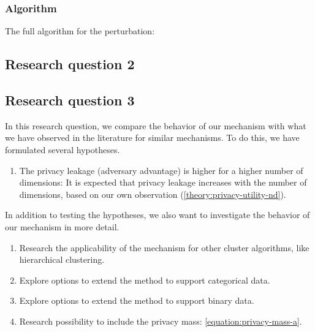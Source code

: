 \subsubsection{Algorithm}
The full algorithm for the perturbation:


\subsection{Research question 2}

\subsection{Research question 3}

In this research question, we compare the behavior of our mechanism with what we have observed in the literature for similar mechanisms.
To do this, we have formulated several hypotheses.
\begin{enumerate}
  \item The privacy leakage (adversary advantage) is higher for a higher number of dimensions:
        It is expected that privacy leakage increases with the number of dimensions, based on our own observation (\ref{theory:privacy-utility-nd}).
\end{enumerate}
In addition to testing the hypotheses, we also want to investigate the behavior of our mechanism in more detail.
\begin{enumerate}
  \item Research the applicability of the mechanism for other cluster algorithms, like hierarchical clustering.
  \item Explore options to extend the method to support categorical data.
  \item Explore options to extend the method to support binary data.
  \item Research possibility to include the privacy mass: \ref{equation:privacy-mass-a}.
\end{enumerate}
